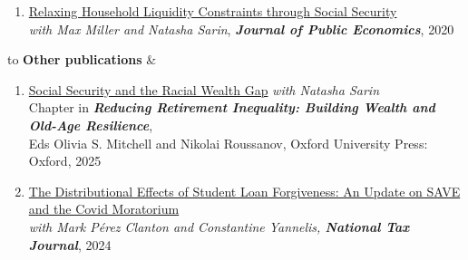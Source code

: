 \documentclass[6pt,letterpaper]{article}
\begin{document}
\begin{enumerate}
	{\small  -- Editor's Choice April 2022 } 
	\item \href{https://www.sciencedirect.com/science/article/pii/S0047272720301079}{Relaxing Household Liquidity Constraints through Social Security} \vspace{.1cm} \\
	{\small  \textit{with Max Miller and Natasha Sarin}}, {\small  \textbf{\textit{Journal of Public Economics}}, 2020}   \\
\end{enumerate}
\begin{table}[H]
	\begin{tabu} to \textwidth {X[l]c}
		{\large \textbf{Other publications}}      &                                                                                                                                                                                                                                                                                                                                                                                                                                                                                                                                                                                                                                                                                                                                                                                                                                                                                                                                                                                                                                                                                                                                                                                                         \\ \hline
	\end{tabu}
\end{table}
\begin{enumerate}	
	\item \href{https://www.dropbox.com/s/6n6jnlzrj4aenpq/CS2023.pdf?dl=0}{Social Security and the Racial Wealth Gap} \vspace{.1cm} 
	{\small  \textit{with Natasha Sarin} }  \\
	{\small Chapter in \textit{\textbf{Reducing Retirement Inequality:  Building Wealth and Old-Age Resilience}},\\ Eds Olivia S. Mitchell and Nikolai Roussanov, Oxford University Press: Oxford, 2025}\vspace{0.1cm} \\
	\item \href{https://www.dropbox.com/scl/fi/zh5g1asxkazg72b2043gw/shortdraft_mpc.pdf?rlkey=wddp0duxwggubwsjaqp8mmj5b&dl=0}{The Distributional Effects of Student Loan Forgiveness: An Update on SAVE and the Covid Moratorium} \vspace{.1cm} \\
	{\small  \textit{with Mark Pérez Clanton and Constantine Yannelis, \textbf{National Tax Journal}}}, 2024 \vspace{.1cm} 
\end{enumerate}
\end{document}
